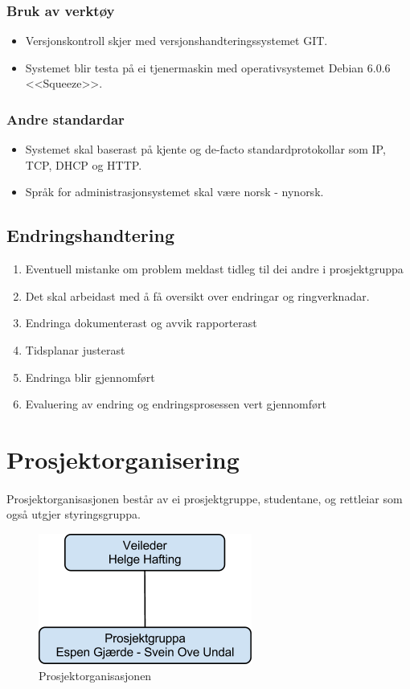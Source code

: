 \documentclass[nynorsk,12pt,a4paper]{article}
\begin{document}
\subsubsection{Bruk av verktøy}
\begin{itemize}
	\item Versjonskontroll skjer med versjonshandteringssystemet GIT. 
	\item Systemet blir testa på ei tjenermaskin med operativsystemet Debian 6.0.6 <<Squeeze>>. 
\end{itemize}
\subsubsection{Andre standardar}
\begin{itemize}
	\item Systemet skal baserast på kjente og de{}-facto standardprotokollar som IP, TCP, DHCP og HTTP.
	\item Språk for administrasjonsystemet skal være norsk - nynorsk.
\end{itemize}

\subsection{Endringshandtering}
\begin{enumerate}
	\item Eventuell mistanke om problem meldast tidleg til dei andre i prosjektgruppa
	\item Det skal arbeidast med å få oversikt over endringar og ringverknadar.
	\item Endringa dokumenterast og avvik rapporterast
	\item Tidsplanar justerast
	\item Endringa blir gjennomført
	\item Evaluering av endring og endringsprosessen vert gjennomført
\end{enumerate}

\newpage
\section{Prosjektorganisering}
\paragraph{}
Prosjektorganisasjonen består av ei prosjektgruppe, studentane, og rettleiar som også utgjer styringsgruppa.

\begin{figure}[h!]
	\centering
	\includegraphics[scale=0.75]{./vdok-img/vdok-org.png}
	\caption{Prosjektorganisasjonen}
\end{figure}
\end{document}

